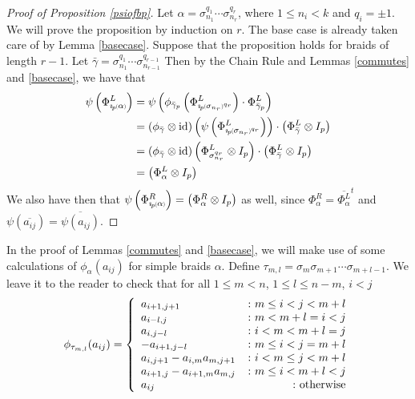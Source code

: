 \documentclass[11pt]{amsart}
\def\s{{\sigma}}
\newcommand*{\subsmallp}[1]{\scalebox{.5}{\ensuremath#1}}
\newcommand{\subpp}[2][p]{\imath_{\hspace*{-1pt}#1}\hspace*{-.5pt}\subsmallp(#2\subsmallp)}
\newcommand\id{\operatorname{id}}
\theoremstyle{definition}
\begin{document}
\begin{proof} [Proof of Proposition \ref{psiofbp}]
Let $\alpha = \s_{n_1}^{q_1}\cdots\s_{n_r}^{q_r}$, where $1\le n_i<k$ and $q_i = \pm 1$.  We will prove the proposition by induction on $r$.  The base case is already taken care of by Lemma \ref{basecase}.  Suppose that the proposition holds for braids of length $r-1$.  Let $\bar\gamma =\s_{n_1}^{q_1}\cdots\s_{n_{r-1}}^{q_{r-1}}$ Then by the Chain Rule and Lemmas \ref{commutes} and \ref{basecase}, we have that
\begin{align*}
\psi\left(\Phi_{\subpp\alpha}^L\right) &= \psi\left(\phi_{\bar\gamma_p}\left(\Phi_{\subpp{\s_{n_r}}^{q_r}}^L\right)\cdot\Phi_{\bar\gamma_p}^L\right)\\
&= \left(\phi_{\bar\gamma}\otimes\id\right)\left(\psi\left(\Phi_{\subpp{\s_{n_r}}^{q_r}}^L\right)\right)\cdot \left(\Phi_{\bar\gamma}^L\otimes I_p\right)\\
&= \left(\phi_{\bar\gamma}\otimes\id\right)\left(\Phi_{\s_{n_r}^{q_r}}^L\otimes I_p\right)\cdot \left(\Phi_{\bar\gamma}^L\otimes I_p\right)\\
&= \left(\Phi_{\alpha}^L\otimes I_p\right)
\end{align*}
We also have then that $\psi\left(\Phi_{\subpp\alpha}^R\right) = \left(\Phi_{\alpha}^R\otimes I_p\right)$ as well, since $\Phi_\alpha^R = \overline{\Phi_\alpha^L}^t$ and $\psi(\overline{a_{ij}}) = \overline{\psi(a_{ij})}$.
\end{proof}


In the proof of Lemmas \ref{commutes} and \ref{basecase}, we will make use of some calculations of $\phi_\alpha(a_{ij})$ for simple braids $\alpha$.  Define $\tau_{m,l} = \s_m\s_{m+1}\cdots\s_{m+l-1}$.  We leave it to the reader to check that for all $1\le m < n$, $1\le l \le n - m$, $i<j$
\begin{equation}\label{tau}
\phi_{\tau_{m,l}}(a_{ij}) =
\left\{
     \begin{array}{lr}
       a_{i+1,j+1} & \colon m\le i<j< m+l\\
       a_{i-l,j} & \colon m<m+l=i<j\\
       a_{i,j-l} & \colon i<m<m+l=j\\
       -a_{i+1,j-l} & \colon m\le i < j = m+l\\
       a_{i,j+1}-a_{i,m}a_{m,j+1} & \colon i<m\le j< m+l\\
       a_{i+1,j}-a_{i+1,m}a_{m,j} & \colon m\le i< m+l<j\\
       a_{ij} & \colon \textnormal{otherwise}
     \end{array}
\right.
\end{equation}
\end{document}
